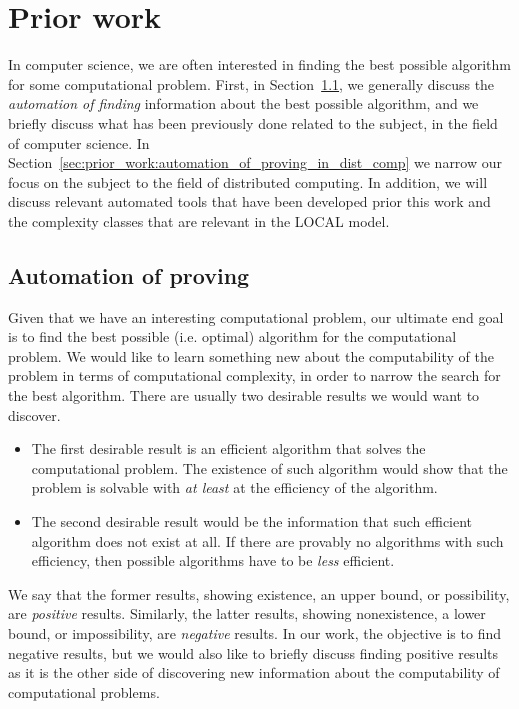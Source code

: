 
\section{Prior work} \label{sec:prior_work}
In computer science, we are often interested in finding the best possible algorithm for some computational problem.
First, in Section~\ref{sec:prior_work:automation_of_proving}, we generally discuss the \emph{automation of finding} information about the best possible algorithm, and we briefly discuss what has been previously done related to the subject, in the field of computer science.
In Section~\ref{sec:prior_work:automation_of_proving_in_dist_comp} we narrow our focus on the subject to the field of distributed computing.
In addition, we will discuss relevant automated tools that have been developed prior this work and the complexity classes that are relevant in the LOCAL model.

\subsection{Automation of proving} \label{sec:prior_work:automation_of_proving} %
Given that we have an interesting computational problem, our ultimate end goal is to find the best possible (i.e. optimal) algorithm for the computational problem.
We would like to learn something new about the computability of the problem in terms of computational complexity, in order to narrow the search for the best algorithm.
There are usually two desirable results we would want to discover.
\begin{itemize}
    \item
    The first desirable result is an efficient algorithm that solves the computational problem.
    The existence of such algorithm would show that the problem is solvable with \emph{at least} at the efficiency of the algorithm.
    \item
    The second desirable result would be the information that such efficient algorithm does not exist at all.
    If there are provably no algorithms with such efficiency, then possible algorithms have to be \emph{less} efficient.
\end{itemize}
We say that the former results, showing existence, an upper bound, or possibility, are \emph{positive} results.
Similarly, the latter results, showing nonexistence, a lower bound, or impossibility, are \emph{negative} results.
In our work, the objective is to find negative results, but we would also like to briefly discuss finding positive results as it is the other side of discovering new information about the computability of computational problems.

